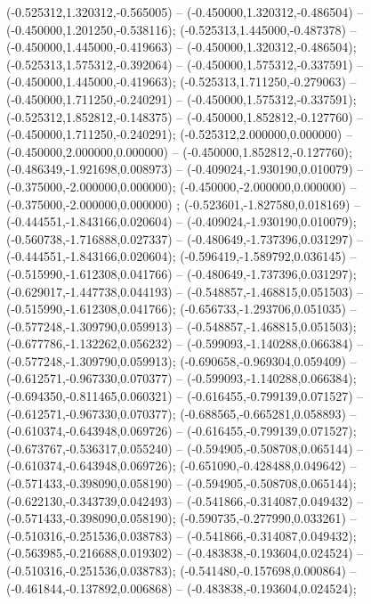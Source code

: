  (-0.525312,1.320312,-0.565005) -- (-0.450000,1.320312,-0.486504) -- (-0.450000,1.201250,-0.538116);
 (-0.525313,1.445000,-0.487378) -- (-0.450000,1.445000,-0.419663) -- (-0.450000,1.320312,-0.486504);
 (-0.525313,1.575312,-0.392064) -- (-0.450000,1.575312,-0.337591) -- (-0.450000,1.445000,-0.419663);
 (-0.525313,1.711250,-0.279063) -- (-0.450000,1.711250,-0.240291) -- (-0.450000,1.575312,-0.337591);
 (-0.525312,1.852812,-0.148375) -- (-0.450000,1.852812,-0.127760) -- (-0.450000,1.711250,-0.240291);
 (-0.525312,2.000000,0.000000) -- (-0.450000,2.000000,0.000000) -- (-0.450000,1.852812,-0.127760);
 (-0.486349,-1.921698,0.008973) -- (-0.409024,-1.930190,0.010079) -- (-0.375000,-2.000000,0.000000);
 (-0.450000,-2.000000,0.000000) -- (-0.375000,-2.000000,0.000000) ;
 (-0.523601,-1.827580,0.018169) -- (-0.444551,-1.843166,0.020604) -- (-0.409024,-1.930190,0.010079);
 (-0.560738,-1.716888,0.027337) -- (-0.480649,-1.737396,0.031297) -- (-0.444551,-1.843166,0.020604);
 (-0.596419,-1.589792,0.036145) -- (-0.515990,-1.612308,0.041766) -- (-0.480649,-1.737396,0.031297);
 (-0.629017,-1.447738,0.044193) -- (-0.548857,-1.468815,0.051503) -- (-0.515990,-1.612308,0.041766);
 (-0.656733,-1.293706,0.051035) -- (-0.577248,-1.309790,0.059913) -- (-0.548857,-1.468815,0.051503);
 (-0.677786,-1.132262,0.056232) -- (-0.599093,-1.140288,0.066384) -- (-0.577248,-1.309790,0.059913);
 (-0.690658,-0.969304,0.059409) -- (-0.612571,-0.967330,0.070377) -- (-0.599093,-1.140288,0.066384);
 (-0.694350,-0.811465,0.060321) -- (-0.616455,-0.799139,0.071527) -- (-0.612571,-0.967330,0.070377);
 (-0.688565,-0.665281,0.058893) -- (-0.610374,-0.643948,0.069726) -- (-0.616455,-0.799139,0.071527);
 (-0.673767,-0.536317,0.055240) -- (-0.594905,-0.508708,0.065144) -- (-0.610374,-0.643948,0.069726);
 (-0.651090,-0.428488,0.049642) -- (-0.571433,-0.398090,0.058190) -- (-0.594905,-0.508708,0.065144);
 (-0.622130,-0.343739,0.042493) -- (-0.541866,-0.314087,0.049432) -- (-0.571433,-0.398090,0.058190);
 (-0.590735,-0.277990,0.033261) -- (-0.510316,-0.251536,0.038783) -- (-0.541866,-0.314087,0.049432);
 (-0.563985,-0.216688,0.019302) -- (-0.483838,-0.193604,0.024524) -- (-0.510316,-0.251536,0.038783);
 (-0.541480,-0.157698,0.000864) -- (-0.461844,-0.137892,0.006868) -- (-0.483838,-0.193604,0.024524);
